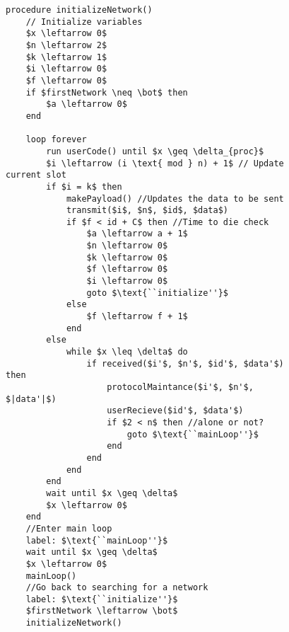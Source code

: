 \begin{figure}
\begin{lstlisting}[label=lst:networkMultiStartCCRC,style=pseudocode,mathescape=true,caption={Pseudocode example of the procedure initializeNetwork() for CCRC for the multiple device activation problem.}]
procedure initializeNetwork()
    // Initialize variables
    $x \leftarrow 0$
    $n \leftarrow 2$
    $k \leftarrow 1$
    $i \leftarrow 0$
    $f \leftarrow 0$
    if $firstNetwork \neq \bot$ then
        $a \leftarrow 0$
    end
    
    loop forever       
        run userCode() until $x \geq \delta_{proc}$
        $i \leftarrow (i \text{ mod } n) + 1$ // Update current slot
        if $i = k$ then
            makePayload() //Updates the data to be sent
            transmit($i$, $n$, $id$, $data$)
            if $f < id + C$ then //Time to die check
                $a \leftarrow a + 1$
                $n \leftarrow 0$
                $k \leftarrow 0$
                $f \leftarrow 0$
                $i \leftarrow 0$
                goto $\text{``initialize''}$
            else
                $f \leftarrow f + 1$
            end
        else
            while $x \leq \delta$ do
                if received($i'$, $n'$, $id'$, $data'$) then
                    protocolMaintance($i'$, $n'$, $|data'|$)
                    userRecieve($id'$, $data'$)
                    if $2 < n$ then //alone or not?
                        goto $\text{``mainLoop''}$
                    end
                end
            end
        end
        wait until $x \geq \delta$
        $x \leftarrow 0$ 
    end
    //Enter main loop
    label: $\text{``mainLoop''}$
    wait until $x \geq \delta$
    $x \leftarrow 0$
    mainLoop()
    //Go back to searching for a network
    label: $\text{``initialize''}$
    $firstNetwork \leftarrow \bot$
    initializeNetwork()
\end{lstlisting}
\end{figure}

